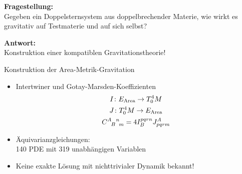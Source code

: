\documentclass{beamer}
\newcommand{\gmc}[4]{\ensuremath{C^{#1\hphantom{#2}#3}_{\hphantom{#1}{#2}\hphantom{#3}#4}}}
\begin{document}
    \begin{frame}
        \textbf{Fragestellung:} \\
        Gegeben ein Doppelsternsystem aus doppelbrechender Materie, wie wirkt es
        gravitativ auf Testmaterie und auf sich selbst?

        \alert{
            \textbf{Antwort:} \\
            Konstruktion einer kompatiblen Gravitationstheorie!
        }
    \end{frame}

    \begin{frame}{Konstruktion der Area-Metrik-Gravitation}
        \begin{itemize}
            \item Intertwiner und Gotay-Marsden-Koeffizienten
            \begin{gather*}
                I \colon E_\text{Area} \rightarrow T^4_0 M \\
                J  \colon T^4_0 M \rightarrow E_\text{Area} \\
                \gmc{A}{B}{n}{m} = 4 I^{pqrn}_B J_{pqrm}^A
            \end{gather*}
            \item Äquivarianzgleichungen: \\
            140 PDE mit 319 unabhängigen Variablen
            \item Keine exakte Lösung mit nichttrivialer Dynamik bekannt!
        \end{itemize}
    \end{frame}
\end{document}
